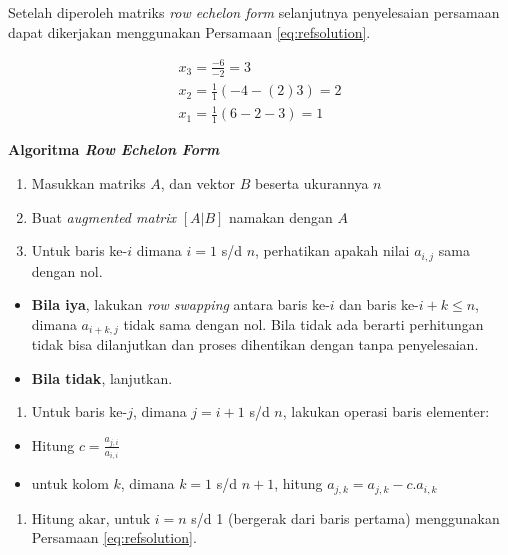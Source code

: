 \documentclass[]{book}
\providecommand{\tightlist}{%
  \setlength{\itemsep}{0pt}\setlength{\parskip}{0pt}}
\theoremstyle{definition}
\theoremstyle{definition}
\theoremstyle{definition}
\theoremstyle{remark}
\begin{document}
Setelah diperoleh matriks \emph{row echelon form} selanjutnya penyelesaian persamaan dapat dikerjakan menggunakan Persamaan \eqref{eq:refsolution}.

\[
\begin{matrix}
  x_3=\frac{-6}{-2}=3 \\
  x_2=\frac{1}{1}\left(-4-\left(2\right)3\right)=2 \\
  x_1=\frac{1}{1}\left(6-2-3\right)=1
\end{matrix}
\]

\textbf{Algoritma \emph{Row Echelon Form}}

\begin{enumerate}
\def\labelenumi{\arabic{enumi}.}
\tightlist
\item
  Masukkan matriks \(A\), dan vektor \(B\) beserta ukurannya \(n\)
\item
  Buat \emph{augmented matrix} \(\left[A|B\right]\) namakan dengan \(A\)
\item
  Untuk baris ke-\(i\) dimana \(i=1\) s/d \(n\), perhatikan apakah nilai \(a_{i,j}\) sama dengan nol.
\end{enumerate}

\begin{itemize}
\tightlist
\item
  \textbf{Bila iya}, lakukan \emph{row swapping} antara baris ke-\(i\) dan baris ke-\(i+k\leq n\), dimana \(a_{i+k,j}\) tidak sama dengan nol. Bila tidak ada berarti perhitungan tidak bisa dilanjutkan dan proses dihentikan dengan tanpa penyelesaian.
\item
  \textbf{Bila tidak}, lanjutkan.
\end{itemize}

\begin{enumerate}
\def\labelenumi{\arabic{enumi}.}
\setcounter{enumi}{3}
\tightlist
\item
  Untuk baris ke-\(j\), dimana \(j=i+1\) s/d \(n\), lakukan operasi baris elementer:
\end{enumerate}

\begin{itemize}
\tightlist
\item
  Hitung \(c=\frac{a_{j,i}}{a_{i,i}}\)
\item
  untuk kolom \(k\), dimana \(k=1\) s/d \(n+1\), hitung \(a_{j,k}=a_{j,k}-c.a_{i,k}\)
\end{itemize}

\begin{enumerate}
\def\labelenumi{\arabic{enumi}.}
\setcounter{enumi}{4}
\tightlist
\item
  Hitung akar, untuk \(i=n\) s/d 1 (bergerak dari baris pertama) menggunakan Persamaan \eqref{eq:refsolution}.
\end{enumerate}
\end{document}
